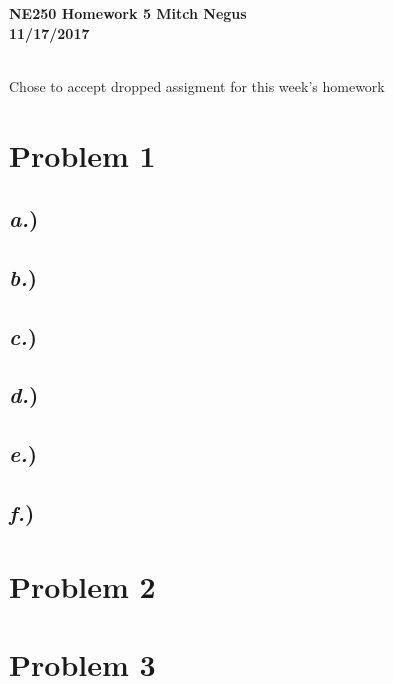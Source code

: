 \documentclass{article}
\begin{document}
\thispagestyle{empty}

{\bf {\large {NE250 Homework {5} \hfill Mitch Negus\\
		\hspace*{\fill} 11/17/2017\\ }}}

\begin{center}	
\-\\	
{\large Chose to accept dropped assigment for this week's homework}
\end{center}		

\section*{Problem 1}

\subsection*{\textit{a.})}
\subsection*{\textit{b.})}
\subsection*{\textit{c.})}
\subsection*{\textit{d.})}
\subsection*{\textit{e.})}
\subsection*{\textit{f.})}




\section*{Problem 2}





\section*{Problem 3}
\end{document}
